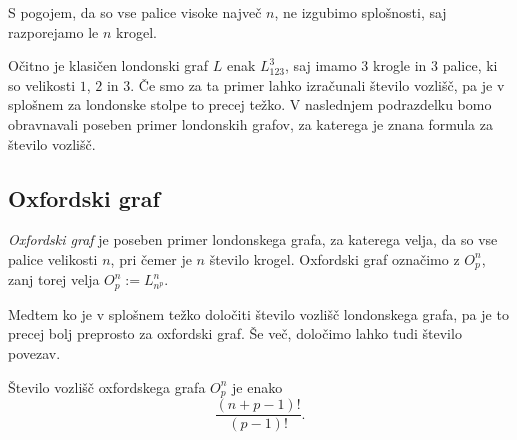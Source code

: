 \documentclass[twoside,11pt]{article}
\begin{document}
S pogojem, da so vse palice visoke največ $n$, ne izgubimo splošnosti, saj razporejamo le $n$ krogel.

Očitno je klasičen londonski graf $L$ enak $L_{123}^3$, saj imamo $3$ krogle in $3$ palice, ki so velikosti $1$, $2$ in $3$.
Če smo za ta primer lahko izračunali število vozlišč, pa je v splošnem za londonske stolpe to precej težko. V naslednjem podrazdelku bomo obravnavali poseben primer londonskih grafov, za katerega je znana formula za število vozlišč. 

\subsection{Oxfordski graf}

\emph{Oxfordski graf} je poseben primer londonskega grafa, za katerega velja, da so vse palice velikosti $n$, pri čemer je $n$ število krogel. Oxfordski graf označimo z $O^n_p$, zanj torej velja $O^n_p := L^n_{n^p}$.

Medtem ko je v splošnem težko določiti število vozlišč londonskega grafa, pa je to precej bolj preprosto za oxfordski graf. Še več, določimo lahko tudi število povezav.

\begin{trditev}
    Število vozlišč oxfordskega grafa $O^n_p$ je enako 
    \begin{equation}
    \label{eq:oxford-vozl}
    \frac{(n+p-1)!}{(p-1)!}.
    \end{equation}
    
\end{trditev}
\end{document}
